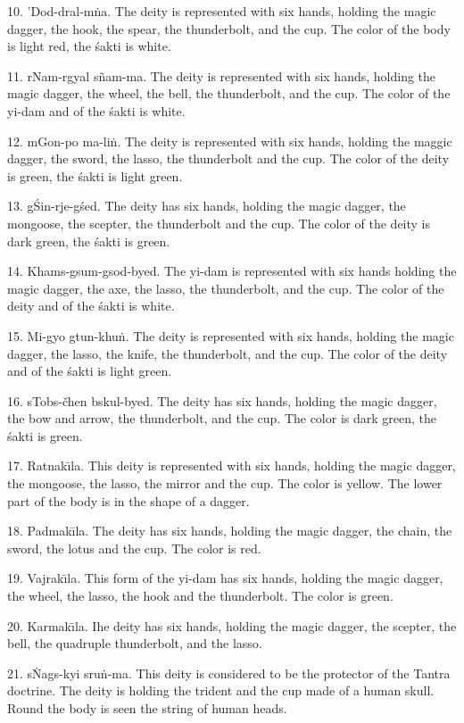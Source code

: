 \documentclass[a4paper, 12pt, oneside]{article}
\begin{document}
10. 'Dod-dral-m\.{n}a. The deity is represented with six hands, holding the magic dagger, the hook, the spear, the thunderbolt, and the cup. The color of the body is light red, the \'{s}akti is white.

11. rNam-rgyal s\~{n}am-ma. The deity is represented with six hands, holding the magic dagger, the wheel, the bell, the thunderbolt, and the cup. The color of the yi-dam and of the \'{s}akti is white.

12. mGon-po ma-li\.{n}. The deity is represented with six hands, holding the maggic dagger, the sword, the lasso, the thunderbolt and the cup. The color of the deity is green, the \'{s}akti is light green.

13. g\'{S}in-rje-g\'{s}ed. The deity has six hands, holding the magic dagger, the mongoose, the scepter, the thunderbolt and the cup. The color of the deity is dark green, the \'{s}akti is green.

14. Khams-gsum-gsod-byed. The yi-dam is represented with six hands holding the magic dagger, the axe, the lasso, the thunderbolt, and the cup. The color of the deity and of the \'{s}akti is white.

15. Mi-gyo gtun-khu\.{n}. The deity is represented with six hands, holding the magic dagger, the lasso, the knife, the thunderbolt, and the cup. The color of the deity and of the \'{s}akti is light green.

16. sTobs-čhen bskul-byed. The deity has six hands, holding the magic dagger, the bow and arrow, the thunderbolt, and the cup. The color is dark green, the \'{s}akti is green.

17. Ratnak\={\i}la. This deity is represented with six hands, holding the magic dagger, the mongoose, the lasso, the mirror and the cup. The color is yellow. The lower part of the body is in the shape of a dagger.

18. Padmak\={\i}la. The deity has six hands, holding the magic dagger, the chain, the sword, the lotus and the cup. The color is red.

19. Vajrak\={\i}la. This form of the yi-dam has six hands, holding the magic dagger, the wheel, the lasso, the hook and the thunderbolt. The color is green.

20. Karmak\={\i}la. Ihe deity has six hands, holding the magic dagger, the scepter, the bell, the quadruple thunderbolt, and the lasso.

21. s\.{N}ags-kyi sru\.{n}-ma. This deity is considered to be the protector of the Tantra doctrine. The deity is holding the trident and the cup made of a human skull. Round the body is seen the string of human heads.
\end{document}
